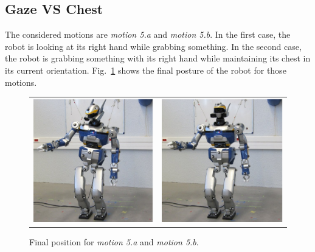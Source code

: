 \documentclass[journal]{IEEEtran}
\begin{document}
\subsection{Gaze VS Chest}
The considered motions are \emph{motion 5.a} and \emph{motion 5.b}.
In the first case, the robot is looking at its right hand while grabbing something.
In the second case, the robot is grabbing something with its right hand while
maintaining its chest in its current orientation. Fig.~\ref{fig:motion5}
shows the final posture of the robot for those motions.
\begin{figure}[t]
  \centering
  \begin{tabular}{cc}
    \includegraphics[width=0.45\linewidth]{img/realRobot/5a/5aFinal1.ps} &
    \includegraphics[width=0.45\linewidth]{img/realRobot/5b/5bFinal1.ps} \\
  \end{tabular}
  \caption{Final position for \emph{motion 5.a} and \emph{motion 5.b}.}
  \label{fig:motion5}
\end{figure}
\end{document}
